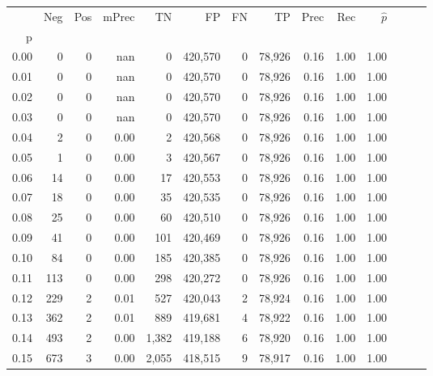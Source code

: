 \begin{tabular}{rrrrrrrrrrrrrr}
\toprule
{} &     Neg &    Pos & mPrec &       TN &       FP &      FN &      TP &  Prec &   Rec & $\hat{p}$ \\
p    &         &        &       &          &          &         &         &       &       &           \\
\midrule
0.00 &       0 &      0 &   nan &        0 &  420,570 &       0 &  78,926 &  0.16 &  1.00 &      1.00 \\
0.01 &       0 &      0 &   nan &        0 &  420,570 &       0 &  78,926 &  0.16 &  1.00 &      1.00 \\
0.02 &       0 &      0 &   nan &        0 &  420,570 &       0 &  78,926 &  0.16 &  1.00 &      1.00 \\
0.03 &       0 &      0 &   nan &        0 &  420,570 &       0 &  78,926 &  0.16 &  1.00 &      1.00 \\
0.04 &       2 &      0 &  0.00 &        2 &  420,568 &       0 &  78,926 &  0.16 &  1.00 &      1.00 \\
0.05 &       1 &      0 &  0.00 &        3 &  420,567 &       0 &  78,926 &  0.16 &  1.00 &      1.00 \\
0.06 &      14 &      0 &  0.00 &       17 &  420,553 &       0 &  78,926 &  0.16 &  1.00 &      1.00 \\
0.07 &      18 &      0 &  0.00 &       35 &  420,535 &       0 &  78,926 &  0.16 &  1.00 &      1.00 \\
0.08 &      25 &      0 &  0.00 &       60 &  420,510 &       0 &  78,926 &  0.16 &  1.00 &      1.00 \\
0.09 &      41 &      0 &  0.00 &      101 &  420,469 &       0 &  78,926 &  0.16 &  1.00 &      1.00 \\
0.10 &      84 &      0 &  0.00 &      185 &  420,385 &       0 &  78,926 &  0.16 &  1.00 &      1.00 \\
0.11 &     113 &      0 &  0.00 &      298 &  420,272 &       0 &  78,926 &  0.16 &  1.00 &      1.00 \\
0.12 &     229 &      2 &  0.01 &      527 &  420,043 &       2 &  78,924 &  0.16 &  1.00 &      1.00 \\
0.13 &     362 &      2 &  0.01 &      889 &  419,681 &       4 &  78,922 &  0.16 &  1.00 &      1.00 \\
0.14 &     493 &      2 &  0.00 &    1,382 &  419,188 &       6 &  78,920 &  0.16 &  1.00 &      1.00 \\
0.15 &     673 &      3 &  0.00 &    2,055 &  418,515 &       9 &  78,917 &  0.16 &  1.00 &      1.00 \\

\end{tabular}
